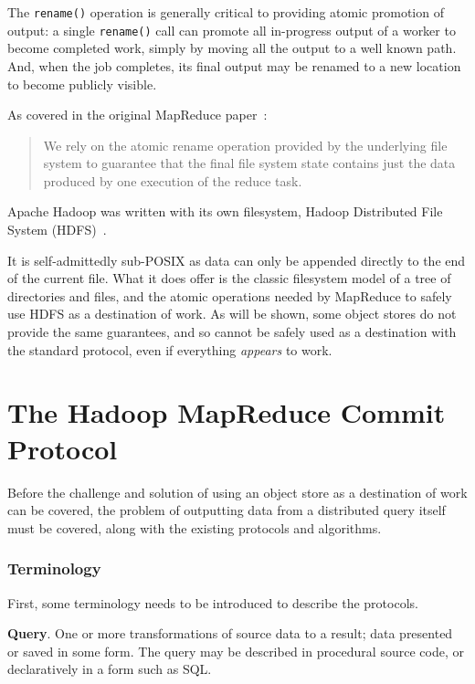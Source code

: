\documentclass[conference]{IEEEtran}
\begin{document}
The \texttt{rename()} operation is generally critical to providing atomic promotion
of output: a single \texttt{rename()} call can promote all in-progress output
of a worker to become completed work, simply by moving all the output to a well known path.
And, when the job completes, its final output may be renamed to a new location to become
publicly visible.

As covered in the original MapReduce paper\ \cite{MapReduce}:

\begin{quote}
We rely on the atomic rename operation provided by the underlying file system
to guarantee that the final file system state contains just the data produced
by one execution of the reduce task.
\end{quote}


Apache Hadoop was written with its own filesystem, Hadoop Distributed File System
(HDFS)\ \cite{Chansler2011}.

It is self-admittedly sub-POSIX as data can only be
appended directly to the end of the current file.
What it does offer is the classic filesystem model of
a tree of directories and files,
and the atomic operations needed by MapReduce to safely use HDFS
as a destination of work.
As will be shown, some object stores do not provide the same guarantees,
and so cannot be safely used as a destination with the standard protocol,
even if everything \emph{appears} to work.



\section{The Hadoop MapReduce Commit Protocol}
\label{sec:hadoop-mr-commit}

Before the challenge and solution of using an object store as a destination
of work can be covered, the problem of outputting data from a distributed
query itself must be covered, along with the existing protocols and algorithms.


\subsubsection{Terminology}

First, some terminology needs to be introduced to describe
the protocols.


\textbf{Query}.
One or more transformations of source data to a result;
data presented or saved in some form.
The query may be described in procedural source code,
or declaratively in a form such as SQL\@.
\end{document}
